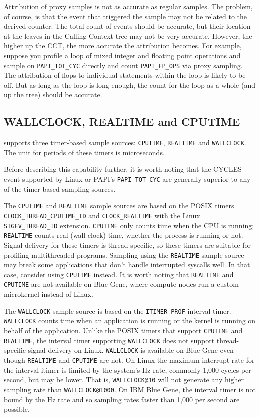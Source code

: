 Attribution of proxy samples is not as accurate as regular samples.
The problem, of course, is that the event that triggered the sample
may not be related to the derived counter.  The total count of events
should be accurate, but their location at the leaves in the Calling
Context tree may not be very accurate.  However, the higher up the
CCT, the more accurate the attribution becomes.  For example, suppose
you profile a loop of mixed integer and floating point operations and
sample on \verb|PAPI_TOT_CYC| directly and count \verb|PAPI_FP_OPS|
via proxy sampling.  The attribution of flops to individual statements
within the loop is likely to be off.  But as long as the loop is long
enough, the count for the loop as a whole (and up the tree) should be
accurate.

\subsection{WALLCLOCK, REALTIME and CPUTIME}

\HPCToolkit{} supports three timer-based sample sources: \verb|CPUTIME|,
\verb|REALTIME| and \verb|WALLCLOCK|.
The unit for periods of these timers is microseconds.

Before describing this capability further, it is worth noting
that the CYCLES event supported by Linux \perfevents{} or PAPI's \verb|PAPI_TOT_CYC| 
are generally superior to any of the timer-based sampling sources. 

\sloppy
The \verb|CPUTIME| and \verb|REALTIME| sample sources are based on the POSIX
timers \verb|CLOCK_THREAD_CPUTIME_ID| and \verb|CLOCK_REALTIME| with 
the Linux \verb|SIGEV_THREAD_ID| extension.  
\verb|CPUTIME| only counts time when the CPU is running;  
\verb|REALTIME| counts
real (wall clock) time, whether the process is running or not. 
Signal delivery for these timers is thread-specific, so these timers are suitable for
profiling multithreaded programs.
Sampling using the \verb|REALTIME| sample source
may break some applications that don't handle interrupted syscalls well.  In that
case, consider using \verb|CPUTIME| instead.
It is worth noting that \verb|REALTIME| and \verb|CPUTIME| are not available on Blue Gene,
where compute nodes run a custom microkernel instead of Linux.

The \verb|WALLCLOCK| sample source is based on the \verb|ITIMER_PROF|
interval timer. 
\verb|WALLCLOCK| counts time when an application is running or the kernel is running on behalf of the
application. 
Unlike the POSIX timers that support  \verb|CPUTIME| and \verb|REALTIME|,
the interval timer supporting \verb|WALLCLOCK| does not support thread-specific signal delivery 
on Linux. 
\verb|WALLCLOCK| is available on Blue Gene even though \verb|REALTIME| and \verb|CPUTIME| are not.
On Linux the maximum interrupt rate for the interval itimer is limited by the
system's Hz rate, commonly 1,000 cycles per second, but may be lower.
That is, \verb|WALLCLOCK@10| will not generate any higher sampling rate
than \verb|WALLCLOCK@1000|.  
On IBM Blue Gene, the interval timer is not
bound by the Hz rate and so sampling rates faster than 1,000 per
second are possible.

